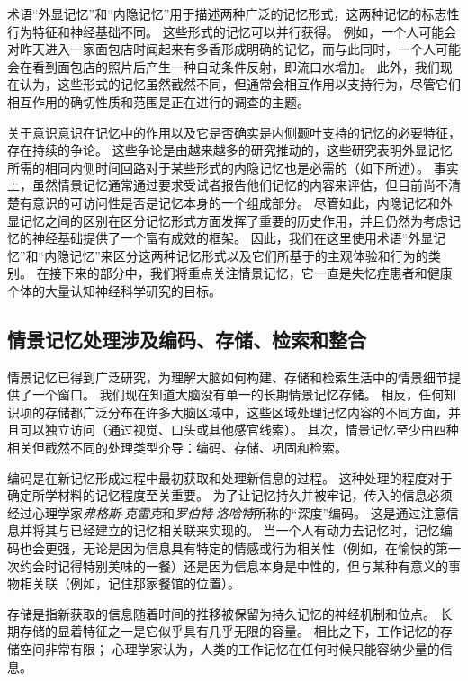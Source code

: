 术语“外显记忆”和“内隐记忆”用于描述两种广泛的记忆形式，这两种记忆的标志性行为特征和神经基础不同。
这些形式的记忆可以并行获得。
例如，一个人可能会对昨天进入一家面包店时闻起来有多香形成明确的记忆，而与此同时，一个人可能会在看到面包店的照片后产生一种自动条件反射，即流口水增加。
此外，我们现在认为，这些形式的记忆虽然截然不同，但通常会相互作用以支持行为，尽管它们相互作用的确切性质和范围是正在进行的调查的主题。


关于意识意识在记忆中的作用以及它是否确实是内侧颞叶支持的记忆的必要特征，存在持续的争论。
这些争论是由越来越多的研究推动的，这些研究表明外显记忆所需的相同内侧时间回路对于某些形式的内隐记忆也是必需的（如下所述）。
事实上，虽然情景记忆通常通过要求受试者报告他们记忆的内容来评估，但目前尚不清楚有意识的可访问性是否是记忆本身的一个组成部分。
尽管如此，内隐记忆和外显记忆之间的区别在区分记忆形式方面发挥了重要的历史作用，并且仍然为考虑记忆的神经基础提供了一个富有成效的框架。
因此，我们在这里使用术语“外显记忆”和“内隐记忆”来区分这两种记忆形式以及它们所基于的主观体验和行为的类别。
在接下来的部分中，我们将重点关注情景记忆，它一直是失忆症患者和健康个体的大量认知神经科学研究的目标。



\subsection{情景记忆处理涉及编码、存储、检索和整合}

情景记忆已得到广泛研究，为理解大脑如何构建、存储和检索生活中的情景细节提供了一个窗口。
我们现在知道大脑没有单一的长期情景记忆存储。
相反，任何知识项的存储都广泛分布在许多大脑区域中，这些区域处理记忆内容的不同方面，并且可以独立访问（通过视觉、口头或其他感官线索）。
其次，情景记忆至少由四种相关但截然不同的处理类型介导：编码、存储、巩固和检索。


编码是在新记忆形成过程中最初获取和处理新信息的过程。
这种处理的程度对于确定所学材料的记忆程度至关重要。
为了让记忆持久并被牢记，传入的信息必须经过心理学家\textit{弗格斯$\cdot$克雷克}和\textit{罗伯特$\cdot$洛哈特}所称的“深度”编码。
这是通过注意信息并将其与已经建立的记忆相关联来实现的。
当一个人有动力去记忆时，记忆编码也会更强，无论是因为信息具有特定的情感或行为相关性（例如，在愉快的第一次约会时记得特别美味的一餐）还是因为信息本身是中性的，但与某种有意义的事物相关联（例如，记住那家餐馆的位置）。


存储是指新获取的信息随着时间的推移被保留为持久记忆的神经机制和位点。
长期存储的显着特征之一是它似乎具有几乎无限的容量。
相比之下，工作记忆的存储空间非常有限；
心理学家认为，人类的工作记忆在任何时候只能容纳少量的信息。



